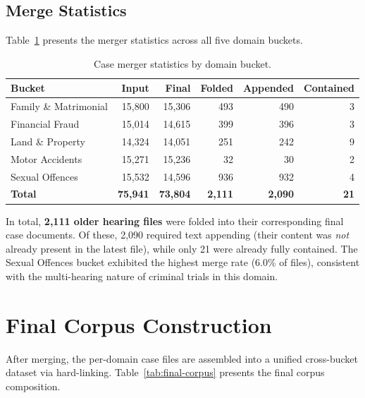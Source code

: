 \subsection{Merge Statistics}

Table~\ref{tab:merge-stats} presents the merger statistics across all five domain buckets.

\begin{table}[H]
\centering
\caption{Case merger statistics by domain bucket.}
\label{tab:merge-stats}
\begin{tabular}{@{}lrrrrr@{}}
\toprule
\textbf{Bucket} & \textbf{Input} & \textbf{Final} & \textbf{Folded} & \textbf{Appended} & \textbf{Contained} \\
\midrule
Family \& Matrimonial  & 15,800 & 15,306 & 493 & 490 & 3 \\
Financial Fraud        & 15,014 & 14,615 & 399 & 396 & 3 \\
Land \& Property       & 14,324 & 14,051 & 251 & 242 & 9 \\
Motor Accidents        & 15,271 & 15,236 &  32 &  30 & 2 \\
Sexual Offences        & 15,532 & 14,596 & 936 & 932 & 4 \\
\midrule
\textbf{Total}         & \textbf{75,941} & \textbf{73,804} & \textbf{2,111} & \textbf{2,090} & \textbf{21} \\
\bottomrule
\end{tabular}
\end{table}

In total, \textbf{2,111 older hearing files} were folded into their corresponding final case documents. Of these, 2,090 required text appending (their content was \emph{not} already present in the latest file), while only 21 were already fully contained. The Sexual Offences bucket exhibited the highest merge rate (6.0\% of files), consistent with the multi-hearing nature of criminal trials in this domain.

\section{Final Corpus Construction}
\label{sec:final-corpus}

After merging, the per-domain case files are assembled into a unified cross-bucket dataset via hard-linking. Table~\ref{tab:final-corpus} presents the final corpus composition.

